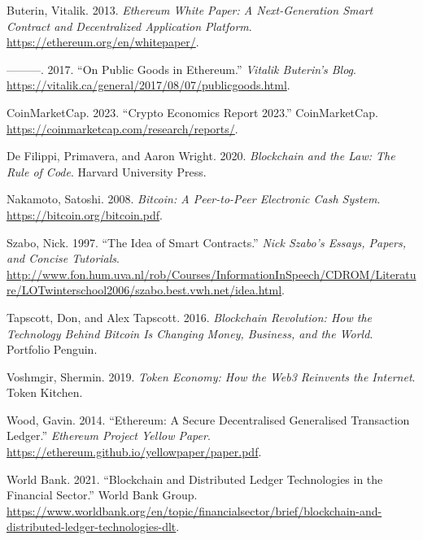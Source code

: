 \documentclass[
  Letterpaper,
]{scrbook}
\newlength{\cslhangindent}
\newenvironment{CSLReferences}[2] %
 {\begin{list}{}{%
  \setlength{\itemindent}{0pt}
  \setlength{\leftmargin}{0pt}
  \setlength{\parsep}{0pt}
  \ifodd #1
   \setlength{\leftmargin}{\cslhangindent}
   \setlength{\itemindent}{-1\cslhangindent}
  \fi
  \setlength{\itemsep}{#2\baselineskip}}}
 {\end{list}}
\begin{document}

\label{refs}
\begin{CSLReferences}{1}{0}
Buterin, Vitalik. 2013. \emph{Ethereum White Paper: A Next-Generation
Smart Contract and Decentralized Application Platform}.
\url{https://ethereum.org/en/whitepaper/}.

---------. 2017. {``On Public Goods in Ethereum.''} \emph{Vitalik
Buterin's Blog}.
\url{https://vitalik.ca/general/2017/08/07/publicgoods.html}.

CoinMarketCap. 2023. {``Crypto Economics Report 2023.''} CoinMarketCap.
\url{https://coinmarketcap.com/research/reports/}.

De Filippi, Primavera, and Aaron Wright. 2020. \emph{Blockchain and the
Law: The Rule of Code}. Harvard University Press.

Nakamoto, Satoshi. 2008. \emph{Bitcoin: A Peer-to-Peer Electronic Cash
System}. \url{https://bitcoin.org/bitcoin.pdf}.

Szabo, Nick. 1997. {``The Idea of Smart Contracts.''} \emph{Nick Szabo's
Essays, Papers, and Concise Tutorials}.
\url{http://www.fon.hum.uva.nl/rob/Courses/InformationInSpeech/CDROM/Literature/LOTwinterschool2006/szabo.best.vwh.net/idea.html}.

Tapscott, Don, and Alex Tapscott. 2016. \emph{Blockchain Revolution: How
the Technology Behind Bitcoin Is Changing Money, Business, and the
World}. Portfolio Penguin.

Voshmgir, Shermin. 2019. \emph{Token Economy: How the Web3 Reinvents the
Internet}. Token Kitchen.

Wood, Gavin. 2014. {``Ethereum: A Secure Decentralised Generalised
Transaction Ledger.''} \emph{Ethereum Project Yellow Paper}.
\url{https://ethereum.github.io/yellowpaper/paper.pdf}.

World Bank. 2021. {``Blockchain and Distributed Ledger Technologies in
the Financial Sector.''} World Bank Group.
\url{https://www.worldbank.org/en/topic/financialsector/brief/blockchain-and-distributed-ledger-technologies-dlt}.

\end{CSLReferences}


\backmatter
\end{document}
